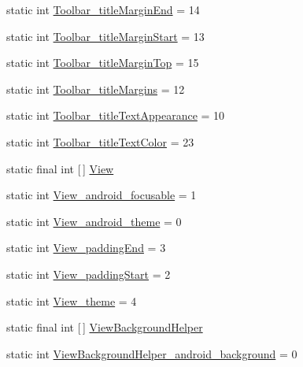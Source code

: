 \begin{DoxyCompactItemize}
\item 
static int \hyperlink{classandroid_1_1support_1_1design_1_1R_1_1styleable_a31063956df1fcf227bb270b3d99d655a}{Toolbar\+\_\+title\+Margin\+End} = 14
\item 
static int \hyperlink{classandroid_1_1support_1_1design_1_1R_1_1styleable_ad039c0dbf8952631ed1ef085c60c5c16}{Toolbar\+\_\+title\+Margin\+Start} = 13
\item 
static int \hyperlink{classandroid_1_1support_1_1design_1_1R_1_1styleable_a29bca0a3147a1442fad7801b4d23fc68}{Toolbar\+\_\+title\+Margin\+Top} = 15
\item 
static int \hyperlink{classandroid_1_1support_1_1design_1_1R_1_1styleable_ae49b23069bb886262bf59ab027045954}{Toolbar\+\_\+title\+Margins} = 12
\item 
static int \hyperlink{classandroid_1_1support_1_1design_1_1R_1_1styleable_aad88a5a97376d2cb38271639cec1ca2c}{Toolbar\+\_\+title\+Text\+Appearance} = 10
\item 
static int \hyperlink{classandroid_1_1support_1_1design_1_1R_1_1styleable_a604b5e782f3ef15da00397e90979933b}{Toolbar\+\_\+title\+Text\+Color} = 23
\item 
static final int \mbox{[}$\,$\mbox{]} \hyperlink{classandroid_1_1support_1_1design_1_1R_1_1styleable_ae848bcf5b638b9248537d28ebf90c67f}{View}
\item 
static int \hyperlink{classandroid_1_1support_1_1design_1_1R_1_1styleable_a1e688704d10e03014118a9af99770e9d}{View\+\_\+android\+\_\+focusable} = 1
\item 
static int \hyperlink{classandroid_1_1support_1_1design_1_1R_1_1styleable_a57c0fdcca2016b94e23a1f36f889f581}{View\+\_\+android\+\_\+theme} = 0
\item 
static int \hyperlink{classandroid_1_1support_1_1design_1_1R_1_1styleable_afd6c00810c12a8e9da050dd3fc5d31ff}{View\+\_\+padding\+End} = 3
\item 
static int \hyperlink{classandroid_1_1support_1_1design_1_1R_1_1styleable_a39729af0c88068197b82555ede76dbd1}{View\+\_\+padding\+Start} = 2
\item 
static int \hyperlink{classandroid_1_1support_1_1design_1_1R_1_1styleable_a9ec1420eec04ffdfd76d5ad0ea0818ef}{View\+\_\+theme} = 4
\item 
static final int \mbox{[}$\,$\mbox{]} \hyperlink{classandroid_1_1support_1_1design_1_1R_1_1styleable_a7df8d9542168fb1f80021c7e5b776ddb}{View\+Background\+Helper}
\item 
static int \hyperlink{classandroid_1_1support_1_1design_1_1R_1_1styleable_ac588ebcd504382c5ace2ad9a48ce0511}{View\+Background\+Helper\+\_\+android\+\_\+background} = 0

\end{DoxyCompactItemize}
